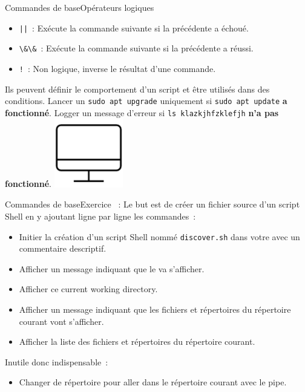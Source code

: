 \documentclass{beamer}
\begin{document}
    \begin{frame}{Commandes de base}{Opérateurs logiques}
        \begin{itemize}
            \item \lstinline{||}~: Exécute la commande suivante si la précédente a échoué.
            \item \lstinline{\&\&}~: Exécute la commande suivante si la précédente a réussi.
            \item \lstinline{!}~: Non logique, inverse le résultat d'une commande.
        \end{itemize}
        Ils peuvent définir le comportement d'un script et être utilisés dans des conditions.
        \bigbreak
        Lancer un \lstinline{sudo apt upgrade} uniquement si \lstinline{sudo apt update} \textbf{a fonctionné}.
        \bigbreak
        Logger un message d'erreur si \lstinline{ls klazkjhfzklefjh} \textbf{n'a pas fonctionné}.
        \bigbreak
        \centering
        \includegraphics[width=3cm]{image/desktop}
    \end{frame}

    \begin{frame}{Commandes de base}{Exercice \execcounterdispinc{}~:}
        Le but est de créer un fichier source d'un script Shell en y ajoutant ligne par ligne les commandes~:
        \begin{itemize}
            \item Initier la création d'un script Shell nommé \lstinline{discover.sh} dans votre  avec un commentaire descriptif.
            \item Afficher un message indiquant que le  va s'afficher.
            \item Afficher ce current working directory.
            \item Afficher un message indiquant que les fichiers et répertoires du répertoire courant vont s'afficher.
            \item Afficher la liste des fichiers et répertoires du répertoire courant.
        \end{itemize}

        Inutile donc indispensable~:
        \begin{itemize}
            \item Changer de répertoire pour aller dans le répertoire courant avec le pipe.
        \end{itemize}
    \end{frame}
\end{document}
